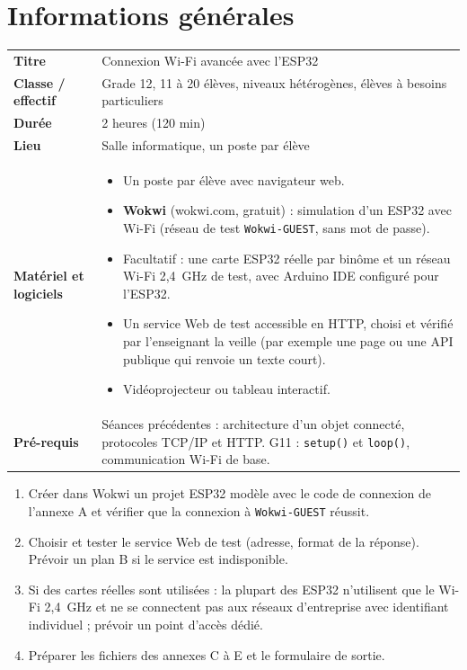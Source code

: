 \documentclass[11pt,a4paper]{article}
\begin{document}

\section{Informations générales}
\begin{tabularx}{\linewidth}{>{\bfseries}p{3.6cm}Y}
\toprule
Titre & Connexion Wi-Fi avancée avec l'ESP32\\
Classe / effectif & Grade 12, 11 à 20 élèves, niveaux hétérogènes, élèves à besoins particuliers\\
Durée & 2 heures (120 min)\\
Lieu & Salle informatique, un poste par élève\\
Matériel et logiciels &
\begin{itemize}
 \item Un poste par élève avec navigateur web.
 \item \textbf{Wokwi} (wokwi.com, gratuit) : simulation d'un ESP32 avec Wi-Fi (réseau de test \texttt{Wokwi-GUEST}, sans mot de passe).
 \item Facultatif : une carte ESP32 réelle par binôme et un réseau Wi-Fi 2,4~GHz de test, avec Arduino IDE configuré pour l'ESP32.
 \item Un service Web de test accessible en HTTP, choisi et vérifié par l'enseignant la veille (par exemple une page ou une API publique qui renvoie un texte court).
 \item Vidéoprojecteur ou tableau interactif.
\end{itemize}\\
Pré-requis &
Séances précédentes : architecture d'un objet connecté, protocoles TCP/IP et HTTP. G11 : \texttt{setup()} et \texttt{loop()}, communication Wi-Fi de base.\\
\bottomrule
\end{tabularx}

\begin{astuce}
\begin{enumerate}
 \item Créer dans Wokwi un projet ESP32 modèle avec le code de connexion de l'annexe A et vérifier que la connexion à \texttt{Wokwi-GUEST} réussit.
 \item Choisir et tester le service Web de test (adresse, format de la réponse). Prévoir un plan B si le service est indisponible.
 \item Si des cartes réelles sont utilisées : la plupart des ESP32 n'utilisent que le Wi-Fi 2,4~GHz et ne se connectent pas aux réseaux d'entreprise avec identifiant individuel ; prévoir un point d'accès dédié.
 \item Préparer les fichiers des annexes C à E et le formulaire de sortie.
\end{enumerate}
\end{astuce}
\end{document}
